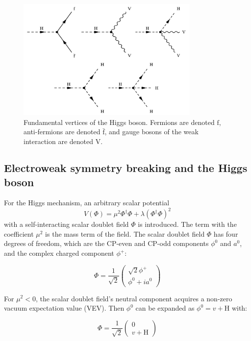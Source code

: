 \begin{figure}[htbp]
  \centering
  \includegraphics[width=0.8\textwidth]{plots/chapter2/h_vertices.png}
  \caption{Fundamental vertices of the Higgs boson. Fermions are denoted $\text{f}$, anti-fermions are denoted $\bar{\text{f}}$, and gauge bosons of the weak interaction are denoted $\text{V}$.}
  \label{fig:h_vertices}
\end{figure}

\subsection{Electroweak symmetry breaking and the Higgs boson}
For the Higgs mechanism, an arbitrary scalar potential
%
\begin{equation}
  V(\Phi)=\mu^2 \Phi^{\dagger} \Phi+\lambda(\Phi^{\dagger} \Phi)^2
\end{equation}
%
with a self-interacting scalar doublet field $\Phi$ is introduced. The term with the coefficient $\mu^2$ is the mass term of the field. The scalar doublet field $\Phi$ has four degrees of freedom, which are the CP-even and CP-odd components $\phi^{0}$ and $a^{0}$, and the complex charged component $\phi^{+}$:

\begin{equation}
  \Phi=\frac{1}{\sqrt{2}}\left(
  \begin{array}{c}
    \sqrt{2} \phi^{+} \\
    \phi^{0}+i a^{0}
  \end{array}\right)
\end{equation}

For $\mu^2<0$, the scalar doublet field's neutral component acquires a non-zero vacuum expectation value (VEV). Then $\phi^{0}$ can be expanded as $\phi^{0} = v + \text{H}$ with:

\begin{equation}
  \Phi=\frac{1}{\sqrt{2}}\left(
  \begin{array}{c}
    0 \\
    v + \text{H}
  \end{array}\right)
\end{equation}

